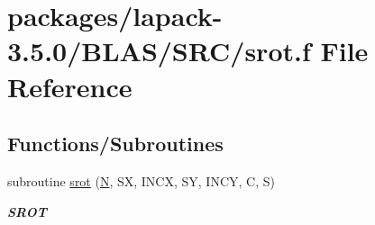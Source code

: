 \hypertarget{lapack-3_85_80_2BLAS_2SRC_2srot_8f}{}\section{packages/lapack-\/3.5.0/\+B\+L\+A\+S/\+S\+R\+C/srot.f File Reference}
\label{lapack-3_85_80_2BLAS_2SRC_2srot_8f}
\subsection*{Functions/\+Subroutines}
\begin{DoxyCompactItemize}
\item 
subroutine \hyperlink{group__single__blas__level1_ga0ce1ab4726eb7ad925cbd89f100d5ce0}{srot} (\hyperlink{polmisc_8c_a0240ac851181b84ac374872dc5434ee4}{N}, S\+X, I\+N\+C\+X, S\+Y, I\+N\+C\+Y, C, S)
\begin{DoxyCompactList}\small\item\em {\bfseries S\+R\+O\+T} \end{DoxyCompactList}\end{DoxyCompactItemize}

